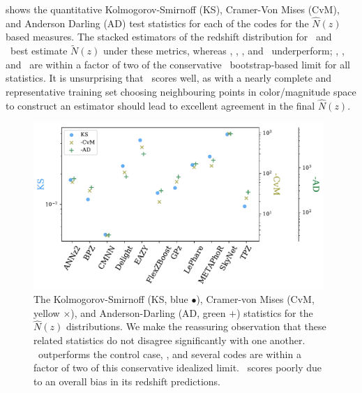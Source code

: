  shows the quantitative Kolmogorov-Smirnoff (KS), Cramer-Von Mises (CvM), and Anderson Darling (AD) test statistics for each of the codes for the $\hat{N}(z)$ based measures.
The stacked estimators of the redshift distribution for \cmnn\ and \trainz\ best estimate $\tilde{N}(z)$ under these metrics, whereas \eazy, \lephare, \metaphor, and \skynet\ underperform; \bpz, \gpz, and \tpz\ are within a factor of two of the conservative \trainz\ bootstrap-based limit for all statistics.
It is unsurprising that \cmnn\ scores well, as with a nearly complete and representative training set choosing neighbouring points in color/magnitude space to construct an estimator should lead to excellent agreement in the final $\hat{N}(z)$.

\begin{figure}
	\centering
	\includegraphics[width=0.98\textwidth]{figures/pzdc1/KSvsCvMvsAD_Nz.pdf}
	\caption[The Kolmogorov-Smirnoff, Cramer-von Mises, and Anderson-Darling statistics for the $\hat{N}(z)$ distributions of each code considered in ]
	{The Kolmogorov-Smirnoff (KS, blue $\bullet$), Cramer-von Mises (CvM, yellow $\times$), and Anderson-Darling (AD, green $+$) statistics for the $\hat{N}(z)$ distributions.
		We make the reassuring observation that these related statistics do not disagree significantly with one another.
		\cmnn\ outperforms the control case, \trainz, and several codes are within a factor of two of this conservative idealized limit.
		\skynet\ scores poorly due to an overall bias in its redshift predictions.}
\end{figure}


